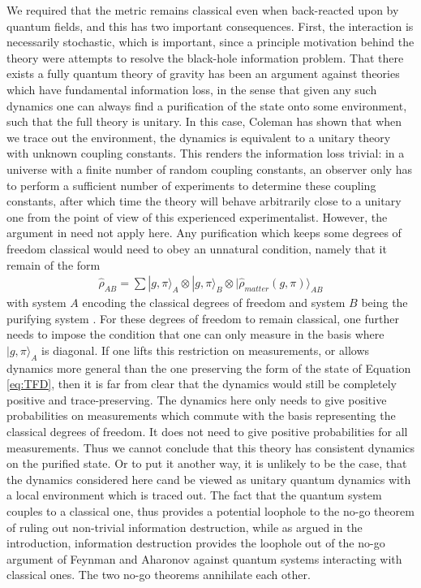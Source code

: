 \documentclass[aps,pra,showpacs,citeautoscript,amsmath,amssymb,floatfix,superscriptaddress,bbm, verbatim,amsfonts,changes,12pt,nofootinbib,longbibliography]{revtex4-2}
\newcommand{\ket}[1]{|#1\rangle}
\renewcommand{\varrho}{\hat{\rho}}
\begin{document}
We required that\label{par:require} the metric remains classical even when back-reacted upon by quantum fields, and this has two important consequences. First, the interaction is necessarily stochastic, which is important, since a principle motivation behind the theory were attempts to resolve the black-hole information problem.
That there exists a fully quantum theory of gravity has been an argument against theories which have fundamental information loss, in the sense that given any such dynamics one can always find a purification of the state onto some environment, such that the full theory is unitary. 
In this case,  Coleman has shown that when we trace out the environment, the dynamics is equivalent to a unitary theory with unknown coupling constants\cite{coleman1988black}. 
This renders the information loss trivial: in a universe with a finite number of random coupling constants, an observer only has to perform a sufficient number of experiments to determine these coupling constants, after which time the theory will behave arbitrarily close to a unitary one from the  point of view of this experienced experimentalist.\label{par:coleman} However, the argument in \cite{coleman1988black} need not apply here. Any purification which keeps some degrees of freedom classical would need to obey an unnatural condition, namely that it remain of the form
\begin{align}
\varrho_{AB}=\sum
\ket{g,\pi}_A
\otimes\ket{g,\pi}_B
\otimes\ket{\varrho_{matter}(g,\pi)}_{AB}
\label{eq:TFD}
\end{align}
with system $A$ encoding the
classical degrees of freedom and system $B$ being the purifying system
\cite{TFD_foot}. For these degrees of freedom to remain classical, one further needs to impose the condition that one can only measure in the basis where $\ket{g,\pi}_A$ is diagonal. If one lifts this restriction on measurements, or allows dynamics more general than the one preserving the form of the state of Equation \eqref{eq:TFD}, then it is far from clear that the dynamics would still be completely positive and trace-preserving. The dynamics here only needs to give positive probabilities on measurements which commute with the basis representing the classical degrees of freedom. It does not need to give positive probabilities for all measurements. Thus we cannot conclude that this theory has consistent dynamics on the purified state. Or to put it another way, it is unlikely to be the case, that the dynamics considered here cand be viewed as unitary quantum dynamics with a local environment which is traced out. The fact that the quantum system couples to a classical one, thus provides a potential loophole to the no-go theorem of \cite{coleman1988black} ruling out non-trivial information destruction, while as argued in the introduction, information destruction provides the loophole out of the no-go argument of Feynman and Aharonov against quantum systems interacting with classical ones. The two no-go theorems annihilate each other.
\end{document}
